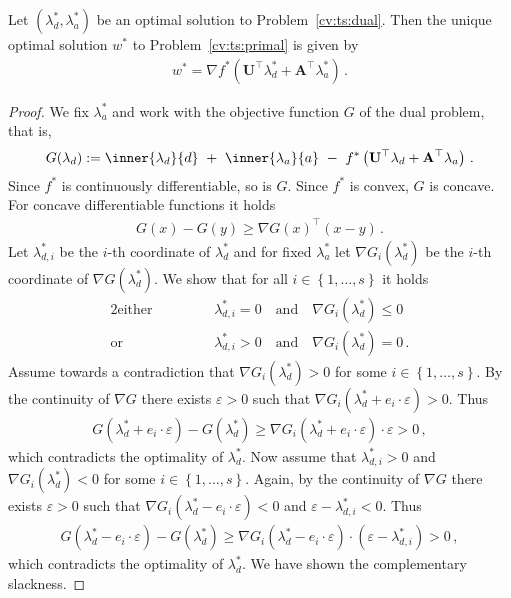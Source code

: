 \begin{ftheorem}
  Let 
$
(\lambda_d^*,\lambda_a^*)
$
be an optimal solution to
Problem~\ref{cv:ts:dual}.
Then the unique optimal solution $w^*$ to 
Problem~\ref{cv:ts:primal}
is given by
\begin{gather}
  w^*
  =
  \nabla
    f^*
    \left( 
      \mathbf{U}^\top  \lambda_d^*
      +
      \mathbf{A}^\top  \lambda_a^*
    \right)
    \,.
\end{gather}
\end{ftheorem}
\begin{proof}
  We fix 
  $
  \lambda_a^*
  $
  and
  work with the objective function $G$ of the dual problem, that is,
  \begin{gather}
    G
(\lambda_d)
:
=
    \inner
    {\lambda_d}
    {d}
    \ 
    +
    \ 
    \inner
    {\lambda_a}
    {a}
    \ 
    -
    \ 
    f^*
    \left( 
      \mathbf{U}^\top  \lambda_d
      +
      \mathbf{A}^\top  \lambda_a
    \right)
    \,.
  \end{gather}
  Since $f^*$ is continuously differentiable, so is $G$. 
  Since $f^*$ is convex, $G$ is concave.
  For concave differentiable functions it holds
  \begin{gather}
    G(x)-G(y)
    \ge
    \nabla
    G(x)^\top
    (x-y)
    \,.
  \end{gather}
Let
$\lambda_{d,i}^*$ be the $i$-th coordinate of $\lambda_d^*$ and for
fixed
$\lambda_a^*$ let
$
\nabla
G_i
(\lambda_d^*)
$
be the $i$-th coordinate of 
$
\nabla
G
(\lambda_d^*)
$.
We show that for all 
$
  i\in \left\{ 1,\ldots, s \right\}
$
it holds
\begin{alignat*}{2}
  \text{either}
  &
  &&
  \qquad
  \lambda_{d,i}^*
  = 0
  \quad
  \text{and}
  \quad
  \nabla
  G
  _i(
  \lambda_{d}^*
  ) \le 0
  \\
  \text{or}
  &
  &&
  \qquad
  \lambda_{d,i}^*
  > 0
  \quad
  \text{and}
  \quad
  \nabla
  G
  _i(
  \lambda_{d}^*
  ) = 0
  \,.
\end{alignat*}
Assume towards a contradiction that 
$
\nabla G_i(\lambda_d^*)>0
$
for some 
$
  i\in \left\{ 1,\ldots, s \right\}
$.
By the continuity of $\nabla G$ there exists $\varepsilon>0$ such that 
$
\nabla G_i(
\lambda_d^*
+
e_i\cdot \varepsilon
)
>
0
$.
Thus
\begin{gather}
  G
  (
\lambda_d^*
+
e_i\cdot \varepsilon
  )
  -
  G
  (
\lambda_d^*
  )
  \ge
\nabla G_i(
\lambda_d^*
+
e_i\cdot \varepsilon
)
\cdot
\varepsilon
>0
\,,
\end{gather}
which contradicts the optimality of 
$
\lambda_d^*
$.
Now assume that
$ \lambda_{d,i}^*>0 $ and 
$
  \nabla G_i(\lambda_d^*)< 0
$
for some
$
  i\in \left\{ 1,\ldots, s \right\}
$.
Again, by the 
continuity of $\nabla G$ there exists $\varepsilon>0$ such that
$
  \nabla G_i(\lambda_d^*-e_i\cdot \varepsilon)< 0
$
and
$
\varepsilon
-
\lambda_{d,i}^*
<0
$.
Thus
\begin{gather}
  G
  (
\lambda_d^*
-
e_i\cdot \varepsilon
  )
  -
  G
  (
\lambda_d^*
  )
  \ge
\nabla G_i(
\lambda_d^*
-
e_i\cdot \varepsilon
)
\cdot
\left( 
\varepsilon
-
\lambda_{d,i}^*
\right)
>0
\,,
\end{gather}
which contradicts the optimality of 
$
\lambda_d^*
$.
We have shown the complementary slackness.

\end{proof}
